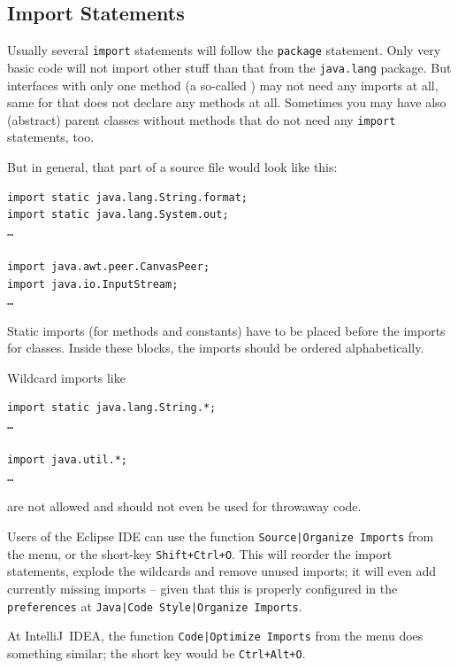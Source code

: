 \subsection{Import Statements}\label{sec:ImportStatements}
Usually several \lstinline|import| statements will follow the \lstinline|package| statement. Only very basic code will not import other stuff than that from the \lstinline|java.lang| package. But interfaces with only one method (a so-called  \autocite{ORACLE_DOC_FUNCTIONALINTERFACE_ANNOTATION}) may not need any imports at all, same for  that does not declare any methods at all. Sometimes you may have also (abstract) parent classes without methods that do not need any \lstinline|import| statements, too.

But in general, that part of a source file would look like this:
\begin{lstlisting}
import static java.lang.String.format;
import static java.lang.System.out;
…

import java.awt.peer.CanvasPeer;
import java.io.InputStream;
…
\end{lstlisting}
Static imports (for methods and constants) have to be placed before the imports for classes. Inside these blocks, the imports should be ordered alphabetically.

Wildcard imports like
\begin{lstlisting}
import static java.lang.String.*;
…

import java.util.*;
…
\end{lstlisting}
are not allowed and should not even be used for throwaway code. 

Users of the Eclipse IDE can use the function \texttt{Source|Organize Imports} from the menu, or the short-key \texttt{Shift+Ctrl+O}. This will reorder the import statements, explode the wildcards and remove unused imports; it will even add currently missing imports – given that this is properly configured in the \texttt{preferences} at \texttt{Java|Code Style|Organize Imports}.

At IntelliJ~IDEA, the function \texttt{Code|Optimize Imports} from the menu does something similar; the short key would be \texttt{Ctrl+Alt+O}.

